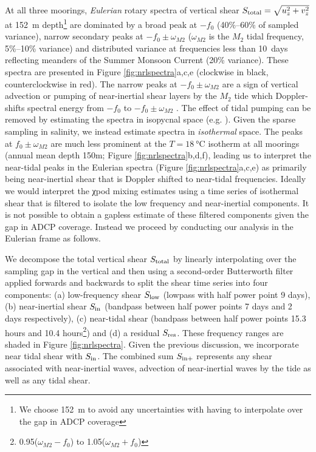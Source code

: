 \documentclass[onecol]{ametsoc}
\begin{document}
At all three moorings, \emph{Eulerian} rotary spectra of vertical shear \(S_\text{total} = \sqrt{u_z^2 + v_z^2}\) at \SI{152}{m} depth\footnote{We choose \SI{152}{m} to avoid any uncertainties with having to interpolate over the gap in ADCP coverage} are dominated by a broad peak at \(-f_0\) (40\%--60\% of sampled variance), narrow secondary peaks at \(-f_0 \pm ω_{M2}\) (\(ω_{M2}\) is the \(M_2\) tidal frequency, 5\%--10\% variance) and distributed variance at frequencies less than \SI{10}{days} reflecting meanders of the Summer Monsoon Current (20\% variance).
These spectra are presented in Figure \ref{fig:nrlspectra}a,c,e (clockwise in black, counterclockwise in red).
The narrow peaks at \(-f_0 \pm ω_{M2}\) are a sign of vertical advection or pumping of near-inertial shear layers by the \(M_2\) tide which Doppler-shifts spectral energy from \(-f_0\) to \(-f_0 \pm ω_{M2}\) \citep{Alford2001a}.
The effect of tidal pumping can be removed by estimating the spectra in isopycnal space (e.g. \citealp{Alford2017}).
Given the sparse sampling in salinity, we instead estimate spectra in \emph{isothermal} space.
The peaks at \(f_0 \pm ω_{M2}\) are much less prominent at the $T=\SI{18}{\celsius}$ isotherm at all moorings (annual mean depth 150m; Figure \ref{fig:nrlspectra}b,d,f), leading us to interpret the near-tidal peaks in the Eulerian spectra (Figure \ref{fig:nrlspectra}a,c,e) as primarily being near-inertial shear that is Doppler shifted to near-tidal frequencies.
Ideally we would interpret the χpod mixing estimates using a time series of isothermal shear that is filtered to isolate the low frequency and near-inertial components.
It is not possible to obtain a gapless estimate of these filtered components given the gap in ADCP coverage.
Instead we proceed by conducting our analysis in the Eulerian frame as follows.

We decompose the total vertical shear \(S_\text{total}\) by linearly interpolating over the sampling gap in the vertical and then using a second-order Butterworth filter applied forwards and backwards to split the shear time series into four components: (a) low-frequency shear \(S_\text{low}\) (lowpass with half power point 9 days), (b) near-inertial shear  \(S_\text{in}\) (bandpass between half power points 7 days and 2 days respectively), (c) near-tidal shear (bandpass between half power points 15.3 hours and 10.4 hours\footnote{0.95(\(ω_{M2} - f_0\)) to 1.05(\(ω_{M2} + f_0\))}) and (d) a residual \(S_\text{res}\).
These frequency ranges are shaded in Figure \ref{fig:nrlspectra}.
Given the previous discussion, we incorporate near tidal shear with \(S_\text{in}\).
The combined sum \(S_\text{in+}\) represents any shear associated with near-inertial waves, advection of near-inertial waves by the tide as well as any tidal shear.
\end{document}
